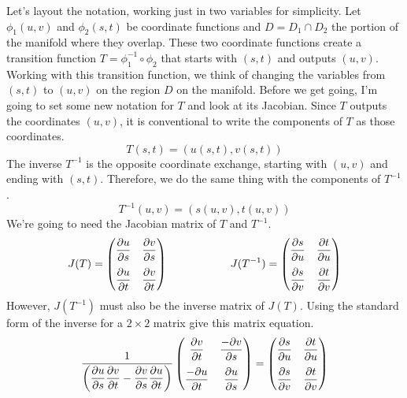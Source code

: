 \documentclass[fleqn,letterpaper]{report}
\begin{document}
Let's layout the notation, working just in two
variables for simplicity. Let $\phi_1(u,v)$ and $\phi_2(s,t)$
be coordinate functions and $D = D_1 \cap D_2$ the portion of
the manifold where they overlap. These two coordinate
functions create a transition function $T = \phi_1^{-1} \circ
\phi_2$ that starts with $(s,t)$ and outputs $(u,v)$. Working
with this transition function, we think of changing the
variables from $(s,t)$ to $(u,v)$ on the region $D$ on the
manifold. Before we get going, I'm going to set some new
notation for $T$ and look at its Jacobian. Since $T$ outputs
the coordinates $(u,v)$, it is conventional to write the
components of $T$ as those coordinates.
\begin{equation*}
T(s,t) = (u(s,t), v(s,t))
\end{equation*}
The inverse $T^{-1}$ is the opposite coordinate exchange,
starting with $(u,v)$ and ending with $(s,t)$. Therefore, we
do the same thing with the components of $T^{-1}$. 
\begin{equation*}
T^{-1}(u,v) = (s(u,v), t(u,v))
\end{equation*}
We're going to need the Jacobian matrix of $T$ and $T^{-1}$. 
\begin{equation*}
J(T) = \left( \begin{matrix} 
\dfrac{\partial u}{\partial s} & 
\dfrac{\partial v}{\partial s} \\[1em]
\dfrac{\partial u}{\partial t} & 
\dfrac{\partial v}{\partial t} 
\end{matrix} \right) \hspace{2cm}
J(T^{-1}) = \left( \begin{matrix} 
\dfrac{\partial s}{\partial u} & 
\dfrac{\partial t}{\partial u} \\[1em]
\dfrac{\partial s}{\partial v} & 
\dfrac{\partial t}{\partial v} 
\end{matrix} \right) 
\end{equation*}
However, $J(T^{-1})$ must also be the inverse matrix of
$J(T)$. Using the standard form of the inverse for a $2\times
2$ matrix give this matrix equation.
\begin{equation*}
\frac{1}{ \left( \dfrac{\partial u}{\partial s} \dfrac{\partial v}{\partial t} - 
\dfrac{\partial v}{\partial s} \dfrac{\partial u}{\partial t} \right) }
\left( \begin{matrix} 
\dfrac{\partial v}{\partial t} & 
\dfrac{-\partial v}{\partial s} \\[1em]
\dfrac{-\partial u}{\partial t} & 
\dfrac{\partial u}{\partial s} 
\end{matrix} \right) = 
\left( \begin{matrix} 
\dfrac{\partial s}{\partial u} & 
\dfrac{\partial t}{\partial u} \\[1em]
\dfrac{\partial s}{\partial v} & 
\dfrac{\partial t}{\partial v} 
\end{matrix} \right) 
\end{equation*}
\end{document}
